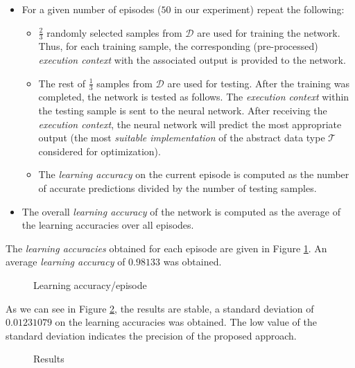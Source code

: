 \begin{itemize}

\item  For a given number of episodes ($50$ in our experiment) repeat the following:

\begin{itemize}

\item $\frac{2}{3}$ randomly selected samples from $\mathcal{D}$ are used for training the network. Thus, for each training sample, the corresponding (pre-processed) \emph{execution context} with the associated output is provided to the network.

\item The rest of $\frac{1}{3}$ samples from $\mathcal{D}$ are used for testing. After the training was completed, the network is tested as follows. The \emph{execution context} within the testing sample is sent to the neural network. After receiving the \emph{execution context}, the neural network will predict the most appropriate output (the most \emph{suitable implementation} of the abstract data type $\mathcal{T}$ considered for optimization).
\item The \emph{learning accuracy} on the current episode is computed as the number of accurate predictions divided by the number of testing samples.

\end{itemize}

\item The overall \emph{learning accuracy} of the network is computed as the average of the learning accuracies over all episodes.

\end{itemize}

The \emph{learning accuracies} obtained for each episode are given in Figure \ref{prec}. An average \emph{learning accuracy} of $0.98133$ was obtained.


\begin{figure}
\centerline{}
       \caption{Learning accuracy/episode}
 \label{prec}
\end{figure}


As we can see in Figure \ref{sprec}, the results are stable, a standard deviation of $0.01231079$  on the learning accuracies was obtained. The low value of the standard deviation indicates the precision of the proposed approach.


\begin{figure}
\centerline{}
       \caption{Results}
 \label{sprec}
\end{figure}


